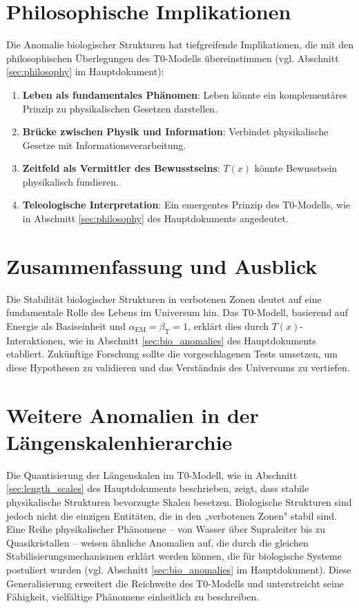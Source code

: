 \documentclass[12pt,a4paper]{article}
\newcommand{\Tfield}{T(x)}
\newcommand{\alphaEM}{\alpha_{\text{EM}}}
\newcommand{\betaT}{\beta_{\text{T}}}
\begin{document}
	\section{Philosophische Implikationen}
	\label{sec:philosophische_implikationen}
	
	Die Anomalie biologischer Strukturen hat tiefgreifende Implikationen, die mit den philosophischen Überlegungen des T0-Modells übereinstimmen (vgl. Abschnitt \ref{sec:philosophy} im Hauptdokument):
	
	\begin{enumerate}
		\item \textbf{Leben als fundamentales Phänomen}: Leben könnte ein komplementäres Prinzip zu physikalischen Gesetzen darstellen.
		\item \textbf{Brücke zwischen Physik und Information}: Verbindet physikalische Gesetze mit Informationsverarbeitung.
		\item \textbf{Zeitfeld als Vermittler des Bewusstseins}: \(\Tfield\) könnte Bewusstsein physikalisch fundieren.
		\item \textbf{Teleologische Interpretation}: Ein emergentes Prinzip des T0-Modells, wie in Abschnitt \ref{sec:philosophy} des Hauptdokuments angedeutet.
	\end{enumerate}
	
	\section{Zusammenfassung und Ausblick}
	\label{sec:zusammenfassung_ausblick}
	
	Die Stabilität biologischer Strukturen in verbotenen Zonen deutet auf eine fundamentale Rolle des Lebens im Universum hin. Das T0-Modell, basierend auf Energie als Basiseinheit und \(\alphaEM = \betaT = 1\), erklärt dies durch \(\Tfield\)-Interaktionen, wie in Abschnitt \ref{sec:bio_anomalies} des Hauptdokuments etabliert. Zukünftige Forschung sollte die vorgeschlagenen Tests umsetzen, um diese Hypothesen zu validieren und das Verständnis des Universums zu vertiefen.
	
	\section{Weitere Anomalien in der Längenskalenhierarchie}
	\label{sec:weitere_anomalien}
	
	Die Quantisierung der Längenskalen im T0-Modell, wie in Abschnitt \ref{sec:length_scales} des Hauptdokuments beschrieben, zeigt, dass stabile physikalische Strukturen bevorzugte Skalen besetzen. Biologische Strukturen sind jedoch nicht die einzigen Entitäten, die in den „verbotenen Zonen" stabil sind. Eine Reihe physikalischer Phänomene – von Wasser über Supraleiter bis zu Quasikristallen – weisen ähnliche Anomalien auf, die durch die gleichen Stabilisierungsmechanismen erklärt werden können, die für biologische Systeme postuliert wurden (vgl. Abschnitt \ref{sec:bio_anomalies} im Hauptdokument). Diese Generalisierung erweitert die Reichweite des T0-Modells und unterstreicht seine Fähigkeit, vielfältige Phänomene einheitlich zu beschreiben.
	
\end{document}
